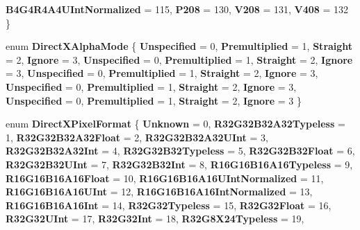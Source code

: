 \begin{DoxyCompactItemize}
{\bfseries B4\+G4\+R4\+A4\+U\+Int\+Normalized} = 115, 
\newline
{\bfseries P208} = 130, 
{\bfseries V208} = 131, 
{\bfseries V408} = 132
 \}
\item 
\mbox{\label{namespace_windows_1_1_graphics_1_1_direct_x_af123b0bc9a4738d81ccfc0ea3154e8d2}} 
enum {\bfseries Direct\+X\+Alpha\+Mode} \{ \newline
{\bfseries Unspecified} = 0, 
{\bfseries Premultiplied} = 1, 
{\bfseries Straight} = 2, 
{\bfseries Ignore} = 3, 
\newline
{\bfseries Unspecified} = 0, 
{\bfseries Premultiplied} = 1, 
{\bfseries Straight} = 2, 
{\bfseries Ignore} = 3, 
\newline
{\bfseries Unspecified} = 0, 
{\bfseries Premultiplied} = 1, 
{\bfseries Straight} = 2, 
{\bfseries Ignore} = 3, 
\newline
{\bfseries Unspecified} = 0, 
{\bfseries Premultiplied} = 1, 
{\bfseries Straight} = 2, 
{\bfseries Ignore} = 3, 
\newline
{\bfseries Unspecified} = 0, 
{\bfseries Premultiplied} = 1, 
{\bfseries Straight} = 2, 
{\bfseries Ignore} = 3
 \}
\item 
\mbox{\label{namespace_windows_1_1_graphics_1_1_direct_x_a842a48af0a06e5cee12c38f8c99fbdce}} 
enum {\bfseries Direct\+X\+Pixel\+Format} \{ \newline
{\bfseries Unknown} = 0, 
{\bfseries R32\+G32\+B32\+A32\+Typeless} = 1, 
{\bfseries R32\+G32\+B32\+A32\+Float} = 2, 
{\bfseries R32\+G32\+B32\+A32\+U\+Int} = 3, 
\newline
{\bfseries R32\+G32\+B32\+A32\+Int} = 4, 
{\bfseries R32\+G32\+B32\+Typeless} = 5, 
{\bfseries R32\+G32\+B32\+Float} = 6, 
{\bfseries R32\+G32\+B32\+U\+Int} = 7, 
\newline
{\bfseries R32\+G32\+B32\+Int} = 8, 
{\bfseries R16\+G16\+B16\+A16\+Typeless} = 9, 
{\bfseries R16\+G16\+B16\+A16\+Float} = 10, 
{\bfseries R16\+G16\+B16\+A16\+U\+Int\+Normalized} = 11, 
\newline
{\bfseries R16\+G16\+B16\+A16\+U\+Int} = 12, 
{\bfseries R16\+G16\+B16\+A16\+Int\+Normalized} = 13, 
{\bfseries R16\+G16\+B16\+A16\+Int} = 14, 
{\bfseries R32\+G32\+Typeless} = 15, 
\newline
{\bfseries R32\+G32\+Float} = 16, 
{\bfseries R32\+G32\+U\+Int} = 17, 
{\bfseries R32\+G32\+Int} = 18, 
{\bfseries R32\+G8\+X24\+Typeless} = 19, 

\end{DoxyCompactItemize}
